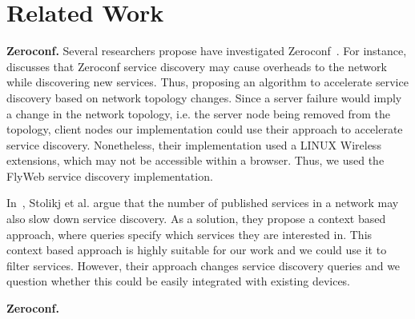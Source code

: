 \section{Related Work}
\label{sec:related_work}

\textbf{Zeroconf.}
Several researchers propose have investigated Zeroconf~\cite{Gunes2002, Bohnenkamp2003, Jara:2012:IPv6DNS-SD}.
For instance, \cite{hong2007accelerating} discusses that Zeroconf service discovery may cause overheads to the network while discovering new services.
Thus, proposing an algorithm to accelerate service discovery based on network topology changes.
Since a server failure would imply a change in the network topology, i.e. the server node being removed from the topology, 
client nodes our implementation could use their approach to accelerate service discovery. 
Nonetheless, their implementation used a LINUX Wireless extensions, which may not be accessible within a browser.
Thus, we used the FlyWeb service discovery implementation.

In~\cite{stolikj2016context}, Stolikj et al. argue that the number of published services in a network may also slow down service discovery.
As a solution, they propose a context based approach, where queries specify which services they are interested in.
This context based approach is highly suitable for our work and we could use it to filter \APIshort services.
However, their approach changes service discovery queries and we question whether this could be easily integrated with existing devices.


\textbf{Zeroconf.}

